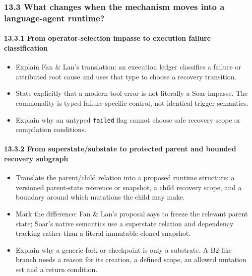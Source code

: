 \subsubsection{13.3 What changes when the mechanism moves into a language-agent runtime?}\label{what-changes-when-the-mechanism-moves-into-a-language-agent-runtime}

\paragraph{13.3.1 From operator-selection impasse to execution failure classification}\label{from-operator-selection-impasse-to-execution-failure-classification}

\begin{itemize}
\tightlist
\item
  Explain Fan \& Lan's translation: an execution ledger classifies a failure or attributed root cause and uses that type to choose a recovery transition.
\item
  State explicitly that a modern tool error is not literally a Soar impasse. The commonality is typed failure-specific control, not identical trigger semantics.
\item
  Explain why an untyped \texttt{failed} flag cannot choose safe recovery scope or compilation conditions.
\end{itemize}

\paragraph{13.3.2 From superstate/substate to protected parent and bounded recovery subgraph}\label{from-superstatesubstate-to-protected-parent-and-bounded-recovery-subgraph}

\begin{itemize}
\tightlist
\item
  Translate the parent/child relation into a proposed runtime structure: a versioned parent-state reference or snapshot, a child recovery scope, and a boundary around which mutations the child may make.
\item
  Mark the difference: Fan \& Lan's proposal says to freeze the relevant parent state; Soar's native semantics use a superstate relation and dependency tracking rather than a literal immutable cloned snapshot.
\item
  Explain why a generic fork or checkpoint is only a substrate. A B2-like branch needs a reason for its creation, a defined scope, an allowed mutation set and a return condition.
\end{itemize}


